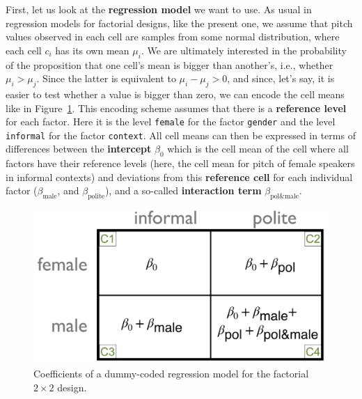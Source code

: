 \documentclass[nobib]{tufte-handout}
\begin{document}
First, let us look at the \textbf{regression model} we want to use. As usual in regression models for
factorial designs, like the present one, we assume that pitch values observed in each cell are
samples from some normal distribution, where each cell $c_i$ has its own mean $\mu_i$. We are
ultimately interested in the probability of the proposition that one cell's mean is bigger than
another's, i.e., whether $\mu_i > \mu_j$. Since the latter is equivalent to $\mu_i - \mu_j > 0$,
and since, let's say, it is easier to test whether a value is bigger than zero, we can encode
the cell means like in Figure~\ref{fig:coefficients_table}. This encoding scheme assumes that
there is a \textbf{reference level} for each factor. Here it is the level \texttt{female} for
the factor \texttt{gender} and the level \texttt{informal} for the factor
\texttt{context}. All cell means can then be expressed in terms of
differences between the \textbf{intercept} $\beta_0$ which is the cell mean of the cell where
all factors have their reference levels (here, the cell mean for pitch of female speakers in
informal contexts) and deviations from this \textbf{reference cell} for each individual factor
($\beta_{\text{male}}$, and $\beta_{\text{polite}}$), and a so-called \textbf{interaction term}
$\beta_{\text{pol\&male}}$.

\begin{figure}[h]
  \centering
    \includegraphics[width = \textwidth]{pics/table_coefficients.png}
    \caption{Coefficients of a dummy-coded regression model for the factorial $2 \times 2$ design.}
    \label{fig:coefficients_table}
\end{figure}
\end{document}
